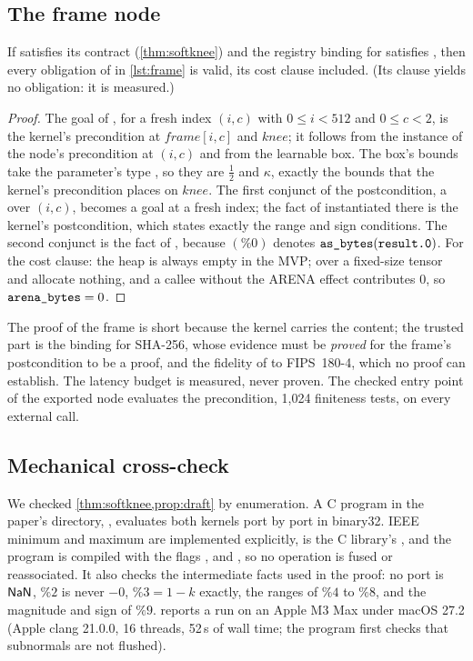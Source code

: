 \subsection{The frame node}

\begin{proposition}\label{prop:frame}
If  satisfies its contract (\cref{thm:softknee}) and the registry binding for
 satisfies , then every obligation of
 in \cref{lst:frame} is valid, its cost clause included. (Its 
clause yields no obligation: it is measured.)
\end{proposition}
\begin{proof}
The goal of , for a fresh index $(i,c)$ with $0\le i<512$ and $0\le c<2$, is the
kernel's precondition at $\mathit{frame}[i,c]$ and $\mathit{knee}$; it follows from the
instance of the node's precondition at $(i,c)$ and from the learnable box. The box's bounds take
the parameter's type , so they are $\frac12$ and $\kappa$, exactly the bounds that the
kernel's precondition places on $\mathit{knee}$. The first
conjunct of the postcondition, a  over $(i,c)$, becomes a goal at a fresh index; the
fact of  instantiated there is the kernel's postcondition, which states exactly
the range and sign conditions. The second conjunct is the fact of , because
$(\%0)$ denotes $\texttt{as\_bytes}(\texttt{result.0})$. For the cost clause: the heap is
always empty in the MVP;  over a fixed-size tensor and  allocate
nothing, and a callee without the \textsf{ARENA} effect contributes $0$, so
$\texttt{arena\_bytes}=0$.
\end{proof}

The proof of the frame is short because the kernel carries the content; the trusted part is the
binding for SHA-256, whose evidence must be \emph{proved} for the frame's postcondition to be a
proof, and the fidelity of  to FIPS~180-4, which no proof can establish. The
latency budget is measured, never proven. The checked entry point of the exported node
evaluates the precondition, 1,024 finiteness tests, on every external call.

\subsection{Mechanical cross-check}

We checked \cref{thm:softknee,prop:draft} by enumeration. A C program in the paper's directory,
, evaluates both kernels port by port in binary32. IEEE minimum and
maximum are implemented explicitly,  is the C library's , and the program is
compiled with the flags ,  and , so no
operation is fused or reassociated. It also checks the intermediate facts used in the proof: no port is $\mathsf{NaN}$,
$\%2$ is never $-0$, $\%3=1-k$ exactly, the ranges of $\%4$ to $\%8$, and the magnitude and
sign of $\%9$.  reports a run on an Apple M3 Max under macOS 27.2 (Apple clang
21.0.0, 16 threads, 52\,s of wall time; the program first checks that subnormals are not
flushed).

